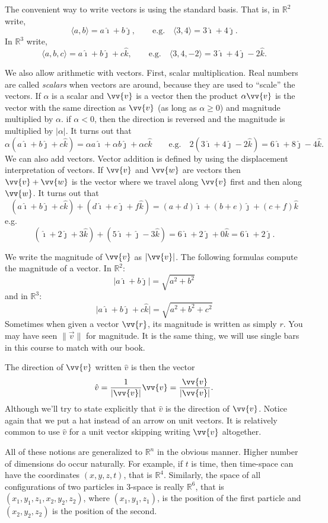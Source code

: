 \documentclass[11pt]{article}
\newcommand{\sabs}[1]{\lvert {#1} \rvert}
\newcommand{\snorm}[1]{\lVert {#1} \rVert}
\newcommand{\R}{{\mathbb{R}}}
\newcommand{\veci}{\hat{\imath}}
\newcommand{\vecj}{\hat{\jmath}}
\newcommand{\veck}{\hat{k}}
\begin{document}
The convenient way to write vectors is using the standard basis.
That is, in $\R^2$ write,
$$
\langle a,b \rangle = a \veci + b \vecj,
\qquad \text{e.g.} \quad
\langle 3,4 \rangle = 3 \veci + 4 \vecj.
$$
In $\R^3$ write,
$$
\langle a,b,c \rangle = a \veci + b \vecj + c \veck,
\qquad \text{e.g.} \quad
\langle 3,4,-2 \rangle = 3 \veci + 4 \vecj - 2 \veck.
$$

We also allow arithmetic with vectors.
First, scalar multiplication.
Real numbers are called \emph{scalars} when vectors are around,
because they are used to ``scale'' the vectors.
If $\alpha$ is a scalar and $\vv{v}$
is a vector then the product $\alpha\vv{v}$ is the vector with the same direction as
$\vv{v}$ (as long as $\alpha \geq 0$) and magnitude multiplied by $\alpha$.
if $\alpha < 0$, then the direction is reversed and the magnitude is multiplied by
$\sabs{\alpha}$.
It turns out that
$$
\alpha ( a \veci + b \vecj + c \veck ) =
\alpha a \veci + \alpha b \vecj + \alpha c \veck
\qquad \text{e.g.} \quad
2 ( 3 \veci + 4 \vecj - 2 \veck ) =
6 \veci + 8 \vecj - 4 \veck
.
$$
We can also add vectors.
Vector addition is defined by using the displacement interpretation of vectors.
If $\vv{v}$ and $\vv{w}$ are vectors
then $\vv{v}+\vv{w}$ is the vector where we travel along $\vv{v}$ first
and then along $\vv{w}$.
It turns out that
$$
( a \veci + b \vecj + c \veck ) +
( d \veci + e \vecj + f \veck ) =
(a+d) \veci + (b+e) \vecj + (c+f) \veck
$$
e.g.
$$
( \veci + 2 \vecj + 3 \veck ) +
( 5 \veci + \vecj - 3 \veck ) =
6 \veci + 2 \vecj + 0 \veck = 6 \veci + 2 \vecj
.
$$

We write the magnitude of $\vv{v}$ as
$\sabs{\vv{v}}$.
The following formulas compute the magnitude of a vector.
In $\R^2$:
$$
\sabs{a \veci + b \vecj}
=
\sqrt{a^2+b^2}
$$
and in $\R^3$:
$$
\sabs{a \veci + b \vecj + c \veck}
=
\sqrt{a^2+b^2+c^2}
$$
Sometimes when given a vector $\vv{r}$, its magnitude is written as simply $r$.
You may have seen $\snorm{\vec{v}}$ for magnitude.  It is the same thing, we will use
single bars in this course to match with our book.

The direction of $\vv{v}$ written $\hat{v}$ is then
the vector
$$
\hat{v} = \frac{1}{\sabs{\vv{v}}} \vv{v} = \frac{\vv{v}}{\sabs{\vv{v}}} .
$$
Although we'll try to state explicitly that $\hat{v}$  is the direction of $\vv{v}$.
Notice again that we put a hat instead of an arrow on unit vectors.  It is relatively
common to use $\hat{v}$ for a unit vector skipping writing $\vv{v}$ altogether.

All of these notions are generalized to $\R^n$ in the obvious manner.
Higher number of dimensions do occur naturally.
For example, if $t$ is time, then time-space can have the coordinates $(x,y,z,t)$,
that is $\R^4$.  Similarly, the space of all configurations of two particles in 3-space
is really $\R^6$, that is $(x_1,y_1,z_1,x_2,y_2,z_2)$, where
$(x_1,y_1,z_1)$, is the position of the first particle and $(x_2,y_2,z_2)$ is
the position of the second.
\end{document}
